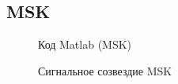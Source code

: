 \documentclass[12pt,a4paper]{scrartcl}
\begin{document}
\subsection{MSK}
\label{sec:MSK}
\begin{figure}[h!]
\caption{Код Matlab (MSK)}
\end{figure}

\begin{figure}[h!]
\caption{Сигнальное созвездие MSK}
\end{figure}

\clearpage
\newpage
\end{document}
